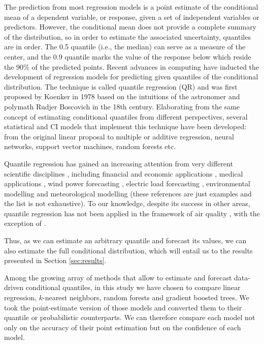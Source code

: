 \documentclass[a4paper,twocolumn,5p]{elsarticle}
\begin{document}
The prediction from most regression models is a
point estimate of the conditional mean of a dependent variable, or
response, given a set of independent variables or predictors. However,
the conditional mean does not provide a complete summary
of the distribution, so in order to estimate the associated
uncertainty, quantiles are in order. The 0.5 quantile (i.e., the
median) can serve as a measure of the center, and the 0.9 quantile
marks the value of the response below which reside the 90\% of the
predicted points. Recent advances in computing have inducted the
development of regression models for predicting given quantiles of the
conditional distribution. The technique is called quantile regression
(QR) and was first proposed by Koenker in 1978
\cite{koenker_quantile_2001} based on the intuitions of the
astronomer and polymath Rudjer Boscovich in the 18th
century. Elaborating from the same concept of estimating conditional
quantiles from different perspectives, several statistical and CI
models that implement this technique have been developed: from the
original linear proposal to multiple or additive regression, neural
networks, support vector machines, random forests etc.

Quantile regression has gained an increasing attention from very
different scientific disciplines \cite{yu_quantile_2003}, including
financial and economic applications \cite{ben_rejeb_financial_2016},
medical applications \cite{jang_quantile_2018}, wind power
forecasting \cite{wan_direct_2017}, electric load forecasting
\cite{lebotsa_short_2018}, environmental modelling
\cite{cade_gentle_2003} and meteorological modelling
\cite{baur_modelling_2004} (these references are just
examples and the list is not exhaustive). To our knowledge, despite
its success in other areas, quantile regression has not been applied
in the framework of air quality , with the exception of
 \cite{martinezsilva_forecasting_2016}.

Thus, as we can estimate an arbitrary quantile and forecast its
values, we can also estimate the full conditional distribution, which
will entail us to the results presented in Section \ref{sec:results}.

Among the growing array of methods that allow to estimate and forecast
data-driven conditional quantiles, in this study we have chosen to
compare linear regression,  $k$-nearest neighbors,
 random forests and gradient boosted trees. We took
the point-estimate version of those models and converted them 
to their quantile or probabilistic counterparts. We can therefore 
compare each model not only on the accuracy of their point estimation
but on the confidence of each model.
\end{document}
